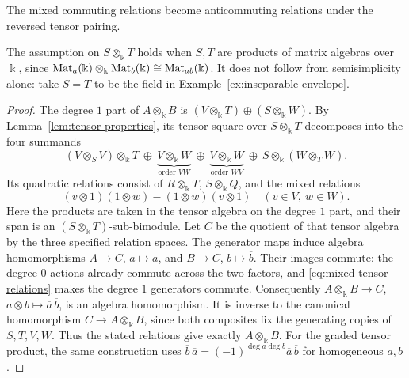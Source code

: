 \begin{advanced}[suppressfirstparskip=true,innertopmargin=0pt]
The mixed commuting relations become anticommuting relations under the reversed tensor pairing.

The assumption on $S\otimes_\Bbbk T$ holds when $S,T$ are products of matrix algebras over $\Bbbk$, since $\operatorname{Mat}\nolimits_a(\Bbbk)\otimes_\Bbbk\operatorname{Mat}\nolimits_b(\Bbbk)\cong\operatorname{Mat}\nolimits_{ab}(\Bbbk)$.
It does not follow from semisimplicity alone: take $S=T$ to be the field in Example~\ref{ex:inseparable-envelope}.

\begin{proof}
The degree $1$ part of $A\otimes_\Bbbk B$ is $(V\otimes_\Bbbk T)\oplus(S\otimes_\Bbbk W)$.
By Lemma~\ref{lem:tensor-properties}, its tensor square over $S\otimes_\Bbbk T$ decomposes into the four summands
\[
(V\otimes_S V)\otimes_\Bbbk T
\ \oplus\ \underbrace{V\otimes_\Bbbk W}_{\text{order }VW}
\ \oplus\ \underbrace{V\otimes_\Bbbk W}_{\text{order }WV}
\ \oplus\ S\otimes_\Bbbk(W\otimes_T W).
\]
Its quadratic relations consist of $R\otimes_\Bbbk T$, $S\otimes_\Bbbk Q$, and the mixed relations
\begin{equation}\label{eq:mixed-tensor-relations}
(v\otimes1)(1\otimes w)-(1\otimes w)(v\otimes1)
\quad(v\in V,\ w\in W).
\end{equation}
Here the products are taken in the tensor algebra on the degree $1$ part, and their span is an $(S\otimes_\Bbbk T)$-sub-bimodule.
Let $C$ be the quotient of that tensor algebra by the three specified relation spaces.
The generator maps induce algebra homomorphisms $A\to C$, $a\mapsto\overline a$, and $B\to C$, $b\mapsto\overline b$.
Their images commute: the degree $0$ actions already commute across the two factors, and \eqref{eq:mixed-tensor-relations} makes the degree $1$ generators commute.
Consequently $A\otimes_\Bbbk B\to C$, $a\otimes b\mapsto\overline a\,\overline b$, is an algebra homomorphism.
It is inverse to the canonical homomorphism $C\to A\otimes_\Bbbk B$, since both composites fix the generating copies of $S,T,V,W$. Thus the stated relations give exactly $A\otimes_\Bbbk B$.
For the graded tensor product, the same construction uses $\overline b\,\overline a=(-1)^{\deg a\deg b}\overline a\,\overline b$ for homogeneous $a,b$.


\end{proof}
\end{advanced}
